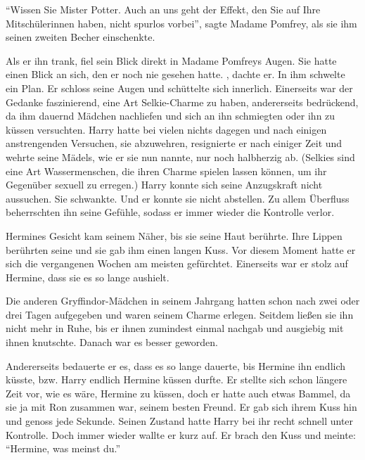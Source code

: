 \begin{rueckblick}
\enquote{Wissen Sie Mister Potter. Auch an uns geht der Effekt, den Sie auf Ihre Mitschülerinnen haben, nicht spurlos vorbei}, sagte Madame Pomfrey, als sie ihm seinen zweiten Becher einschenkte.

Als er ihn trank, fiel sein Blick direkt in Madame Pomfreys Augen. Sie hatte einen Blick an sich, den er noch nie gesehen hatte. , dachte er. In ihm schwelte ein Plan.  Er schloss seine Augen und schüttelte sich innerlich. Einerseits war der Gedanke faszinierend, eine Art Selkie-Charme zu haben, andererseits bedrückend, da ihm dauernd Mädchen nachliefen und sich an ihn schmiegten oder ihn zu küssen versuchten. Harry hatte bei vielen nichts dagegen und nach einigen anstrengenden Versuchen, sie abzuwehren, resignierte er nach einiger Zeit und wehrte seine Mädels, wie er sie nun nannte, nur noch halbherzig ab. (Selkies sind eine Art Wassermenschen, die ihren Charme spielen lassen können, um ihr Gegenüber sexuell zu erregen.) Harry konnte sich seine Anzugskraft nicht aussuchen. Sie schwankte. Und er konnte sie nicht abstellen. Zu allem Überfluss beherrschten ihn seine Gefühle, sodass er immer wieder die Kontrolle verlor.
\end{rueckblick}

Hermines Gesicht kam seinem Näher, bis sie seine Haut berührte. Ihre Lippen berührten seine und sie gab ihm einen langen Kuss. Vor diesem Moment hatte er sich die vergangenen Wochen am meisten gefürchtet. Einerseits war er stolz auf Hermine, dass sie es so lange aushielt.

\begin{rueckblick}
Die anderen Gryffindor-Mädchen in seinem Jahrgang hatten schon nach zwei oder drei Tagen aufgegeben und waren seinem Charme erlegen. Seitdem ließen sie ihn nicht mehr in Ruhe, bis er ihnen zumindest einmal nachgab und ausgiebig mit ihnen knutschte. Danach war es besser geworden.
\end{rueckblick}

Andererseits bedauerte er es, dass es so lange dauerte, bis Hermine ihn endlich küsste, bzw. Harry endlich Hermine küssen durfte. Er stellte sich schon längere Zeit vor, wie es wäre, Hermine zu küssen, doch er hatte auch etwas Bammel, da sie ja mit Ron zusammen war, seinem besten Freund. Er gab sich ihrem Kuss hin und genoss jede Sekunde. Seinen Zustand hatte Harry bei ihr recht schnell unter Kontrolle. Doch immer wieder wallte er kurz auf. Er brach den Kuss und meinte: \enquote{Hermine, was meinst du.}

